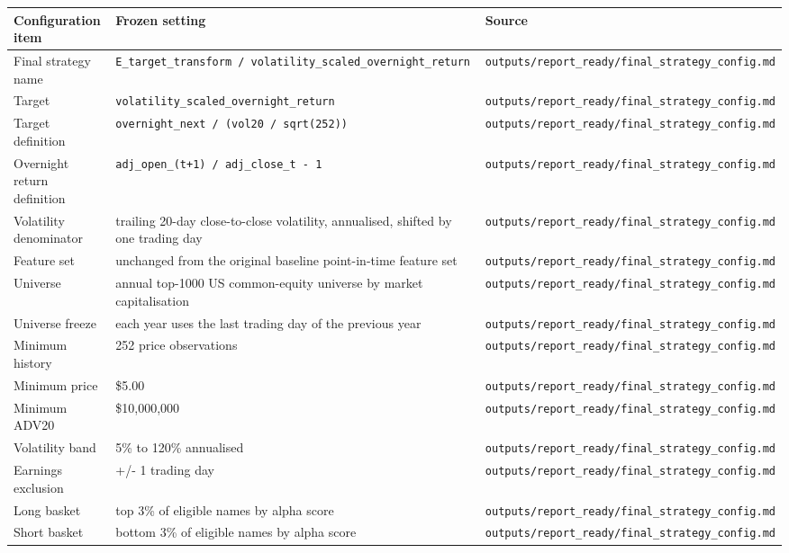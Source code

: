 \documentclass[
]{article}
\begin{document}
\begin{longtable}[]{@{}lll@{}}
\toprule
Configuration item & Frozen setting & Source \\
\midrule
\endhead
Final strategy name &
\texttt{E\_target\_transform\ /\ volatility\_scaled\_overnight\_return}
& \texttt{outputs/report\_ready/final\_strategy\_config.md} \\
Target & \texttt{volatility\_scaled\_overnight\_return} &
\texttt{outputs/report\_ready/final\_strategy\_config.md} \\
Target definition & \texttt{overnight\_next\ /\ (vol20\ /\ sqrt(252))} &
\texttt{outputs/report\_ready/final\_strategy\_config.md} \\
Overnight return definition &
\texttt{adj\_open\_(t+1)\ /\ adj\_close\_t\ -\ 1} &
\texttt{outputs/report\_ready/final\_strategy\_config.md} \\
Volatility denominator & trailing 20-day close-to-close volatility,
annualised, shifted by one trading day &
\texttt{outputs/report\_ready/final\_strategy\_config.md} \\
Feature set & unchanged from the original baseline point-in-time feature
set & \texttt{outputs/report\_ready/final\_strategy\_config.md} \\
Universe & annual top-1000 US common-equity universe by market
capitalisation &
\texttt{outputs/report\_ready/final\_strategy\_config.md} \\
Universe freeze & each year uses the last trading day of the previous
year & \texttt{outputs/report\_ready/final\_strategy\_config.md} \\
Minimum history & 252 price observations &
\texttt{outputs/report\_ready/final\_strategy\_config.md} \\
Minimum price & \$5.00 &
\texttt{outputs/report\_ready/final\_strategy\_config.md} \\
Minimum ADV20 & \$10,000,000 &
\texttt{outputs/report\_ready/final\_strategy\_config.md} \\
Volatility band & 5\% to 120\% annualised &
\texttt{outputs/report\_ready/final\_strategy\_config.md} \\
Earnings exclusion & +/- 1 trading day &
\texttt{outputs/report\_ready/final\_strategy\_config.md} \\
Long basket & top 3\% of eligible names by alpha score &
\texttt{outputs/report\_ready/final\_strategy\_config.md} \\
Short basket & bottom 3\% of eligible names by alpha score &
\texttt{outputs/report\_ready/final\_strategy\_config.md} \\

\end{longtable}
\end{document}
